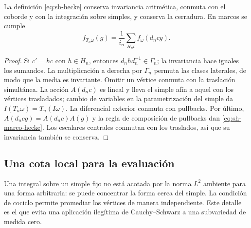 \begin{lema}
\label{lem:sh-hecke}
La definición \eqref{eq:sh-hecke} conserva invariancia aritmética, conmuta con el coborde y con la integración sobre simples, y conserva la cerradura. En marcos se cumple
\begin{equation}
 f_{T_n\omega}(g)=\frac{1}{i_n}\sum_{H_nc} f_\omega(d_ncg).
 \label{eq:sh-marco-hecke}
\end{equation}
\end{lema}
\begin{proof}
Si $c'=hc$ con $h\in H_n$, entonces $d_n h d_n^{-1}\in\Gamma_n$; la invariancia hace iguales los sumandos. La multiplicación a derecha por $\Gamma_n$ permuta las clases laterales, de modo que la media es invariante. Omitir un vértice conmuta con la traslación simultánea. La acción $A(d_nc)$ es lineal y lleva el simple afín a aquel con los vértices trasladados; cambio de variables en la parametrización del simple da $I(T_n\omega)=T_n(I\omega)$. La diferencial exterior conmuta con pullbacks. Por último, $A(d_ncg)=A(d_nc)A(g)$ y la regla de composición de pullbacks dan \eqref{eq:sh-marco-hecke}. Los escalares centrales conmutan con los traslados, así que su invariancia también se conserva.
\end{proof}

\subsection{Una cota local para la evaluación}

Una integral sobre un simple fijo no está acotada por la norma $L^2$ ambiente para una forma arbitraria: se puede concentrar la forma cerca del simple. La condición de cociclo permite promediar los vértices de manera independiente. Este detalle es el que evita una aplicación ilegítima de Cauchy--Schwarz a una subvariedad de medida cero.

